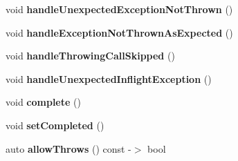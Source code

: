 \begin{DoxyCompactItemize}
\mbox{\label{class_catch_1_1_assertion_handler_a7764d0adb6ed5eeb10964f6abc02fab1}} 
void {\bfseries handle\+Unexpected\+Exception\+Not\+Thrown} ()
\item 
\mbox{\label{class_catch_1_1_assertion_handler_a51e4936e3af43b74690cedae6d2e297a}} 
void {\bfseries handle\+Exception\+Not\+Thrown\+As\+Expected} ()
\item 
\mbox{\label{class_catch_1_1_assertion_handler_a67a194d5518f307c4a16faa03a7f7442}} 
void {\bfseries handle\+Throwing\+Call\+Skipped} ()
\item 
\mbox{\label{class_catch_1_1_assertion_handler_aa2504dad6a91f3645e5f52c932c11270}} 
void {\bfseries handle\+Unexpected\+Inflight\+Exception} ()
\item 
\mbox{\label{class_catch_1_1_assertion_handler_a878a9eb828d8a1863c8dcb6575f6f40e}} 
void {\bfseries complete} ()
\item 
\mbox{\label{class_catch_1_1_assertion_handler_a6756bd5395c0ddd28764a9fb4612d5e4}} 
void {\bfseries set\+Completed} ()
\item 
\mbox{\label{class_catch_1_1_assertion_handler_a193bb3999494c46457f3059184c6b251}} 
auto {\bfseries allow\+Throws} () const -\/$>$ bool
\end{DoxyCompactItemize}
